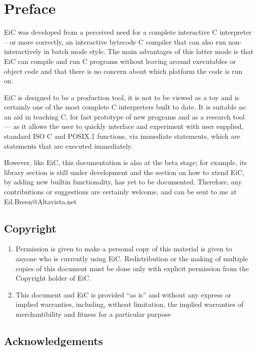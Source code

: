 \chapter{Preface}

EiC was developed from a perceived need for a complete interactive 
C interpreter -- or more correctly, an interactive bytecode C
compiler that can also run non-interactively in 
batch mode style. The main advantages of this latter mode is that
EiC can compile and run C programs without leaving around 
executables or object code and that there is no concern about
which platform the code is run on.

EiC is designed to be a production tool, it is not to be viewed 
as a toy and is certainly one of the most complete C interpreters
built to date. It is suitable as: an aid in teaching C, for fast
prototype of new programs and as a research tool --- as it allows the
user to quickly interface and experiment with user supplied, standard
ISO C and POSIX.1 functions, via immediate statements, which are
statements that are executed immediately.

However, like EiC, this documentation is also at the beta stage; for
example, its library section is still under development and the
section on how to xtend EiC, by adding new builtin
functionality, has yet to be documented.  Therefore, any contributions
or suggestions are certainly welcome, and can be sent to me at
Ed.Breen@Altavista.net

\section*{Copyright}
 
\begin{enumerate}
\item
Permission is given to make a personal copy of this material is
given to anyone who is currently using EiC. Redistribution or the
making of multiple copies of this document must be done only with
explicit permission from the Copyright holder of EiC.

\item
This document and EiC is provided ``as is'' and without any express or
implied warranties, including, without limitation, the implied
warranties of merchantibility and fitness for a particular purpose

\end{enumerate}

\section*{Acknowledgements}

